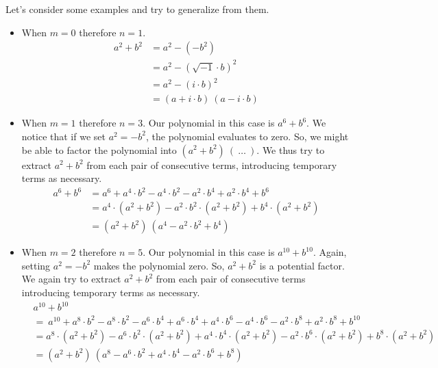\documentclass[12pt]{article}
\begin{document}
Let's consider some examples and try to generalize from them.
\begin{itemize}
\item When $m=0$ therefore $n=1$.
\begin{equation*}
	\begin{aligned}
		a^2+b^2 &= a^2 - \left( -b^2 \right)\\
				&= a^2 - \left( \sqrt{-1}\cdot b \right)^2\\
				&= a^2 - (i\cdot b)^2\\
				&= (a+i\cdot b)\ (a-i\cdot b)
	\end{aligned}
\end{equation*}

\item When $m=1$ therefore $n=3$.
Our polynomial in this case is $a^{6}+b^{6}$. We notice that if we set $a^2 = -b^2$, the polynomial evaluates to zero. So, we might be able to factor the polynomial into $\left(a^2+b^2\right)\ (\ \ldots\ )$. We thus try to extract $a^2+b^2$ from each pair of consecutive terms, introducing temporary terms as necessary.
\begin{equation*}
	\begin{aligned}
		a^6+b^6 &= a^6 + a^4\cdot b^2 - a^4\cdot b^2 - a^2\cdot b^4 + a^2\cdot b^4 + b^6\\
				&= a^4\cdot \left( a^2+b^2 \right) - a^2\cdot b^2\cdot \left( a^2+b^2 \right) + b^4\cdot \left( a^2+b^2 \right)\\
				&= \left( a^2+b^2 \right)\ \left( a^4-a^2\cdot b^2+b^4 \right)
	\end{aligned}
\end{equation*}
\item When $m=2$ therefore $n=5$.
Our polynomial in this case is $a^{10}+b^{10}$. Again, setting $a^2=-b^2$ makes the polynomial zero. So, $a^2+b^2$ is a potential factor. We again try to extract $a^2+b^2$ from each pair of consecutive terms introducing temporary terms as necessary.
\begin{equation*}
	\begin{aligned}
		& a^{10} + b^{10}\\
		&=\ a^{10} + a^8\cdot b^2 - a^8\cdot b^2 - a^6\cdot b^4 + a^6\cdot b^4 + a^4\cdot b^6 - a^4\cdot b^6 - a^2\cdot b^8 + a^2\cdot b^8 + b^{10}\\
		&= a^8 \cdot \left( a^2+b^2 \right) - a^6\cdot b^2\cdot \left( a^2+b^2\right) + a^4\cdot b^4\cdot \left( a^2+b^2 \right) - a^2\cdot b^6\cdot \left( a^2+b^2 \right) + b^8\cdot \left( a^2+b^2 \right)\\
		&= \left( a^2+b^2 \right)\ \left( a^8 - a^6\cdot b^2 + a^4\cdot b^4 - a^2\cdot b^6 + b^8 \right)
	\end{aligned}
\end{equation*}
\end{itemize}
\end{document}
